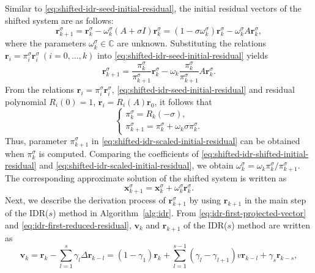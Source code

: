 {Similar to \eqref{eq:shifted-idr-seed-initial-residual}, the initial residual vectors of the shifted system are as follows:}
\begin{equation}\label{eq:shifted-idr-shifted-initial-residual}\bm r_{k+1}^{\sigma}=\bm r_k^{\sigma}-\omega_k^{\sigma}(A+\sigma I)\bm r_k^{\sigma}=(1-\sigma\omega_k^{\sigma})\bm r_k^{\sigma}-\omega_k^{\sigma}A\bm r_k^{\sigma},\end{equation}
{where the parameters $\omega_k^{\sigma}\in\mathbb C$ are unknown. Substituting the relations $\bm r_i=\pi_i^{\sigma}\bm r_i^{\sigma}\ (i=0,\ldots,k)$ into \eqref{eq:shifted-idr-seed-initial-residual} yields}
\begin{equation}\label{eq:shifted-idr-scaled-initial-residual}\bm r_{k+1}^{\sigma}=\frac{\pi_k^{\sigma}}{\pi_{k+1}^{\sigma}}\bm r_k^{\sigma}-\omega_k\frac{\pi_k^{\sigma}}{\pi_{k+1}^{\sigma}}A\bm r_k^{\sigma}.\end{equation}
{From the relations $\bm r_i=\pi_i^{\sigma}\bm r_i^{\sigma}$, \eqref{eq:shifted-idr-seed-initial-residual} and residual polynomial $R_i(0)=1$, $\bm r_i=R_i(A)\bm r_0$, it follows that}
\[\begin{cases}\pi_k^{\sigma}=R_k(-\sigma),\\\pi_{k+1}^{\sigma}=\pi_k^{\sigma}+\omega_k\sigma\pi_k^{\sigma}.\end{cases}\]
{Thus, parameter $\pi_{k+1}^{\sigma}$ in \eqref{eq:shifted-idr-scaled-initial-residual} can be obtained when $\pi_k^{\sigma}$ is computed. Comparing the coefficients of \eqref{eq:shifted-idr-shifted-initial-residual} and \eqref{eq:shifted-idr-scaled-initial-residual}, we obtain $\omega_k^{\sigma}=\omega_k\pi_k^{\sigma}/\pi_{k+1}^{\sigma}$. The corresponding approximate solution of the shifted system is written as}
\begin{equation}\label{eq:shifted-idr-initial-solution}\bm x_{k+1}^{\sigma}=\bm x_k^{\sigma}+\omega_k^{\sigma}\bm r_k^{\sigma}.\end{equation}
{Next, we describe the derivation process of $\bm r_{k+1}^{\sigma}$ by using $\bm r_{k+1}$ in the main step of the IDR($s$) method in Algorithm\ \ref{alg:idr}. From \eqref{eq:idr-first-projected-vector} and \eqref{eq:idr-first-reduced-residual}, $\bm v_k$ and $\bm r_{k+1}$ of the IDR($s$) method are written as}
\begin{equation}\label{eq:shifted-idr-seed-projected-vector}\bm v_k=\bm r_k-\sum_{l=1}^{s}\gamma_l\Delta\bm r_{k-l}=(1-\gamma_1)\bm r_k+\sum_{l=1}^{s-1}(\gamma_l-\gamma_{l+1})v\bm r_{k-l}+\gamma_s\bm r_{k-s},\end{equation}
